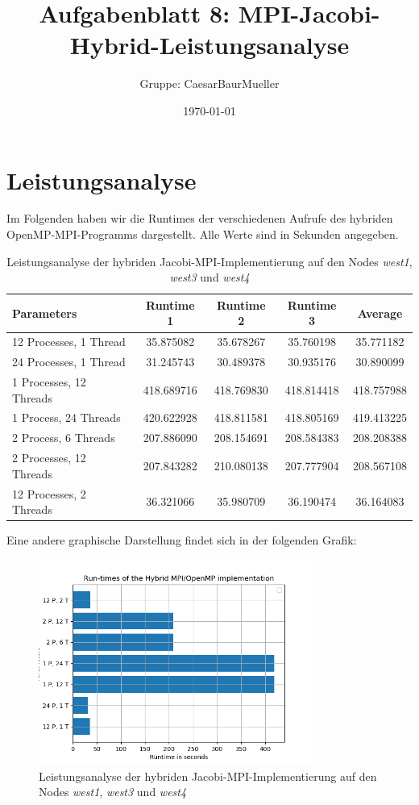 \documentclass[12pt]{article}
\title{Aufgabenblatt 8: MPI-Jacobi-Hybrid-Leistungsanalyse}
\author{Gruppe: CaesarBaurMueller}
\date{\today}
\begin{document}
\maketitle

\begin{sloppypar}
\section*{Leistungsanalyse}
Im Folgenden haben wir die Runtimes der verschiedenen Aufrufe des hybriden OpenMP-MPI-Programms dargestellt. Alle Werte sind in Sekunden angegeben.

\begin{table}[ht]
    \caption{Leistungsanalyse der hybriden Jacobi-MPI-Implementierung auf den Nodes \textit{west1}, \textit{west3} und \textit{west4}}
    \begin{tabular}{l|ccc|c}
        Parameters & Runtime 1 & Runtime 2 & Runtime 3 & Average \\ \hline
        12 Processes, 1 Thread & 35.875082 & 35.678267 & 35.760198 & 35.771182 \\ 
        24 Processes, 1 Thread & 31.245743 & 30.489378 & 30.935176 & 30.890099 \\ 
        1 Processes, 12 Threads & 418.689716 & 418.769830 & 418.814418 & 418.757988 \\ 
        1 Process, 24 Threads & 420.622928 & 418.811581 & 418.805169 & 419.413225 \\ 
        2 Process, 6 Threads & 207.886090 & 208.154691 & 208.584383 & 208.208388 \\ 
        2 Processes, 12 Threads & 207.843282 & 210.080138 & 207.777904 & 208.567108 \\ 
        12 Processes, 2 Threads & 36.321066 & 35.980709 & 36.190474 & 36.164083 \\ 
    \end{tabular}
\end{table}

Eine andere graphische Darstellung findet sich in der folgenden Grafik:
\begin{figure}[ht]
    \centering
    \caption{Leistungsanalyse der hybriden Jacobi-MPI-Implementierung auf den Nodes \textit{west1}, \textit{west3} und \textit{west4}}
    \includegraphics[width=0.8\textwidth]{average-plot-hybrid-mpi-omp.png}
\end{figure}
\newpage


\end{sloppypar}
\end{document}
